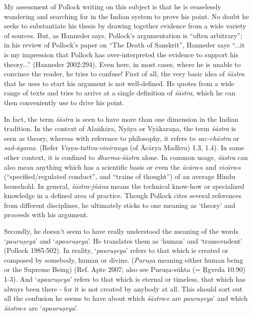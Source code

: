 \newpage

My assessment of Pollock writing on this subject is that he is ceaselessly wandering and searching for in the Indian system to prove his point. No doubt he seeks to substantiate his thesis by drawing together evidence from a wide variety of sources. But, as Hanneder says, Pollock's argumentation is ``often arbitrary''; in his review of Pollock's paper on ``The Death of Sanskrit'', Hanneder says ``...it is my impression that Pollock has over-interpreted the evidence to support his theory...'' (Hanneder 2002:294). Even here, in most cases, where he is unable to convince the reader, he tries to confuse! First of all, the very basic idea of {\it śāstra} that he uses to start his argument is not well-defined. He quotes from a wide range of texts and tries to arrive at a single definition of {\it śāstra}, which he can then conveniently use to drive his point. 

In fact, the term {\it śāstra} is seen to have more than one dimension in the Indian tradition. In the context of Alaṅkāra, Nyāya or Vyākaraṇa, the term {\it śāstra} is seen as theory, whereas with reference to philosophy, it refers to {\it sac-chāstra} or {\it sad-āgama}. (Refer {\it Viṣṇu-tattva-vinirṇaya} (of Ācārya Madhva) 1.3, 1.4).  In some other context, it is confined to {\it dharma-śāstra} alone. In common usage, {\it śāstra} can also mean anything which has a scientific basis or even the {\it ācāra}-s and {\it vicāra}-s (``specified/regulated conduct'', and ``trains of thought'') of an average Hindu household. In general, {\sl śāstra-jñāna} means the technical know-how or specialized knowledge in a defined area of practice. Though Pollock cites several references from different disciplines, he ultimately sticks to one meaning as `theory' and proceeds with his argument. 

Secondly, he doesn't seem to have really understood the meaning of the words `{\it pauruṣeya}' and `{\it apauruṣeya}'. He translates them as `human' and `transcendent' (Pollock 1985:502). In reality, `{\it pauruṣeya}' refers to that which is created or composed by somebody, human or divine. ({\it Puruṣa} meaning either human being or the Supreme Being) (Ref. Apte 2007; also see Puruṣa-sūkta (= Ṛgveda 10.90) 1-3). And `{\it apauruṣeya}' refers to that which is eternal or timeless, that which has always been there - for it is not created by anybody at all. This should sort out all the confusion he seems to have about which {\it śāstra}-s are {\it pauruṣeya}' and which {\it śāstra}-s are `{\it apauruṣeya}'. 

